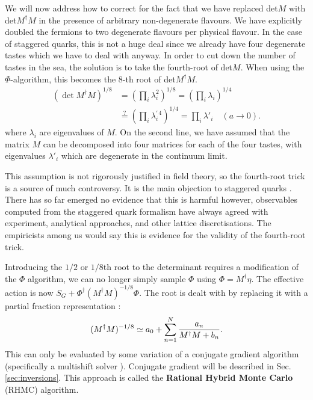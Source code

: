 We will now address how to correct for the fact that we have replaced det$M$ with det$M^{\dagger}M$ in the presence of arbitrary non-degenerate flavours. We have explicitly doubled the fermions to two degenerate flavours per physical flavour. In the case of staggered quarks, this is not a huge deal since we already have four degenerate tastes which we have to deal with anyway. In order to cut down the number of tastes in the sea, the solution is to take the fourth-root of det$M$. When using the $\Phi$-algorithm, this becomes the 8-th root of det$M^{\dagger}M$.
\begin{align}
  (\det M^{\dagger} M )^{1/8} &= (\prod_i \lambda_i^2)^{1/8} = (\prod_i \lambda_i)^{1/4} \\ \nonumber &\stackrel{?}{=} (\prod_i\lambda_i^{'\,4})^{1/4} = \prod_i \lambda'_i \quad (a\to 0).
\end{align}
where $\lambda_i$ are eigenvalues of $M$. On the second line, we have assumed that the matrix $M$ can be decomposed into four matrices for each of the four tastes, with eigenvalues $\lambda'_i$ which are degenerate in the continuum limit.

This assumption is not rigorously justified in field theory, so the fourth-root trick is a source of much controversy. It is the main objection to staggered quarks \cite{JANSEN20043,CREUTZ2007230,Creutz:2007rk}. There has so far emerged no evidence that this is harmful however, observables computed from the staggered quark formalism have always agreed with experiment, analytical approaches, and other lattice discretisations. The empiricists among us would say this is evidence for the validity of the fourth-root trick.

Introducing the $1/2$ or $1/8$th root to the determinant requires a modification of the $\Phi$ algorithm, we can no longer simply sample $\Phi$ using $\Phi=M^{\dagger}\eta$. The effective action is now $S_G + \Phi^{\dagger} (M^{\dagger}M)^{-1/8} \Phi$. The root is dealt with by replacing it with a partial fraction representation \cite{Clark:2006fx}:
\begin{align}
  (M^{\dagger}M)^{-1/8} \simeq a_0 + \sum_{n=1}^N { a_n \over M^{\dagger}M + b_n }.
  \label{eq:rational}
\end{align}
This can only be evaluated by some variation of a conjugate gradient algorithm (specifically a multishift solver \cite{Frommer:1995ik,Jegerlehner:1996pm}). Conjugate gradient will be described in Sec. \ref{sec:inversions}. This approach is called the {\bf{Rational Hybrid Monte Carlo}} (RHMC) algorithm.

